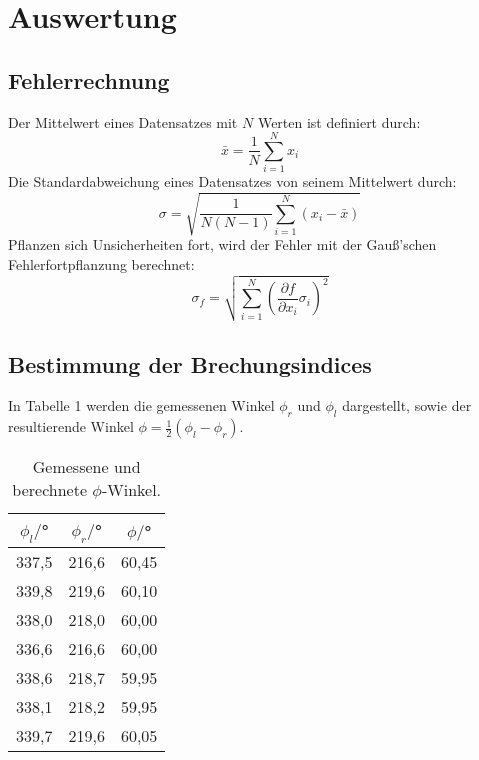 \section{Auswertung}
\label{sec:Auswertung}

\subsection{Fehlerrechnung}
Der Mittelwert eines Datensatzes mit $N$ Werten ist definiert durch:
\begin{equation}
  \bar{x} = \frac{1}{N} \sum_{i=1}^N x_i
\end{equation}
Die Standardabweichung eines Datensatzes von seinem Mittelwert durch:
\begin{equation}
  \sigma = \sqrt{\frac{1}{N(N-1)} \sum_{i=1}^N (x_i - \bar{x})}
\end{equation}
Pflanzen sich Unsicherheiten fort, wird der Fehler mit der Gauß'schen
Fehlerfortpflanzung berechnet:
\begin{equation}
  \sigma_f = \sqrt{
      \sum\limits_{i = 1}^N
       \left( \frac{\partial f}{\partial x_i} \sigma_i \right)^{\!\! 2}
     }
\end{equation}


\subsection{Bestimmung der Brechungsindices}

In Tabelle 1 werden die gemessenen Winkel $\phi_r$ und $\phi_l$ dargestellt, sowie der resultierende Winkel $\phi=\frac{1}{2}(\phi_l-\phi_r)$.

\begin{table}[H]
  \centering
  \caption{Gemessene und berechnete $\phi$-Winkel.}
  \label{tab:spannung1}
  \begin{tabular}{c c c}
    \toprule
    $\phi_l/$° & $\phi_r/$° & $\phi/$° \\
    \midrule
    337,5  &  216,6 & 60,45     \\
    339,8  &  219,6 & 60,10      \\
    338,0  &  218,0 & 60,00      \\
    336,6  &  216,6 & 60,00      \\
    338,6  &  218,7 & 59,95      \\
    338,1  &  218,2 & 59,95      \\
    339,7  &  219,6 & 60,05      \\
    \bottomrule
  \end{tabular}
\end{table}

